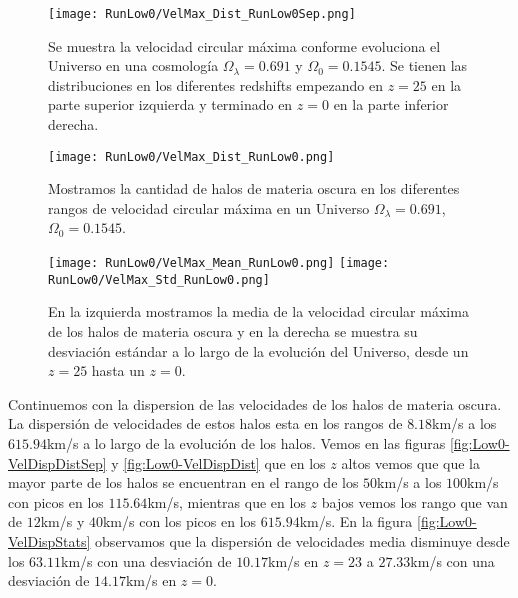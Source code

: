 \begin{figure}[H]
    \centering
    \texttt{[image: RunLow0/VelMax\_Dist\_RunLow0Sep.png]}
    \caption[Velocidad circular máxima en la evolución de un Universo $\Omega_\lambda = 0.691$, $\Omega_0 = 0.1545$]{\footnotesize Se muestra la velocidad circular máxima conforme evoluciona el Universo en una cosmología $\Omega_\lambda = 0.691$ y $\Omega_0 = 0.1545$. Se tienen las distribuciones en los diferentes redshifts empezando en $z=25$ en la parte superior izquierda y terminado en $z=0$ en la parte inferior derecha.}
    \label{fig:Low0-VelMaxDistSep}
\end{figure}

\begin{figure}[H]
    \centering
    \texttt{[image: RunLow0/VelMax\_Dist\_RunLow0.png]}
    \caption[Distribución de la velocidad circular máxima de un Universo $\Omega_\lambda = 0.691$, $\Omega_0 = 0.1545$]{\footnotesize Mostramos la cantidad de halos de materia oscura en los diferentes rangos de velocidad circular máxima en un Universo $\Omega_\lambda = 0.691$, $\Omega_0 = 0.1545$.}
    \label{fig:Low0-VelMaxDist}
\end{figure}

\begin{figure}[H]
    \centering
    \texttt{[image: RunLow0/VelMax\_Mean\_RunLow0.png]}
    \texttt{[image: RunLow0/VelMax\_Std\_RunLow0.png]}
    \caption[Media y desviación estándar de la velocidad circular máxima de un Universo $\Omega_\lambda = 0.691$, $\Omega_0 = 0.1545$]{\footnotesize En la izquierda mostramos la media de la velocidad circular máxima de los halos de materia oscura y en la derecha se muestra su desviación estándar a lo largo de la evolución del Universo, desde un $z=25$ hasta un $z=0$.}
    \label{fig:Low0-VelMaxStats}
\end{figure}

Continuemos con la dispersion de las velocidades de los halos de materia oscura. La dispersión de velocidades de estos halos esta en los rangos de $8.18$km/s a los $615.94$km/s a lo largo de la evolución de los halos. Vemos en las figuras \ref{fig:Low0-VelDispDistSep} y \ref{fig:Low0-VelDispDist} que en los $z$ altos vemos que que la mayor parte de los halos se encuentran en el rango de los $50$km/s a los $100$km/s con picos en los $115.64$km/s, mientras que en los $z$ bajos vemos los rango que van de $12$km/s y $40$km/s con los picos en los $615.94$km/s. En la figura \ref{fig:Low0-VelDispStats} observamos que la dispersión de velocidades media disminuye desde los $63.11$km/s con una desviación de $10.17$km/s en $z=23$ a $27.33$km/s con una desviación de $14.17$km/s en $z=0$.


